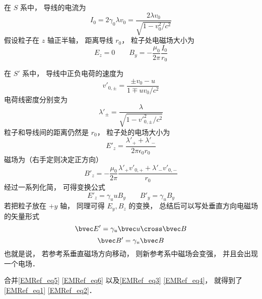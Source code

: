 在 $S$ 系中， 导线的电流为
\begin{equation}
I_0 = 2 \gamma_0 \lambda v_0 = \frac{2 \lambda v_0}{\sqrt{1 - v_0^2/c^2}}
\end{equation}
假设粒子在 $z$ 轴正半轴， 距离导线 $r_0$， 粒子处电磁场大小为
\begin{equation}
E_z = 0 \qquad B_y = -\frac{\mu_0}{2\pi} \frac{I_0}{r_0}
\end{equation}

在 $S'$ 系中， 导线中正负电荷的速度为
\begin{equation}
v'_{0, \pm} = \frac{\pm v_0-u}{1 \mp uv_0/c^2}
\end{equation}
电荷线密度分别变为
\begin{equation}
\lambda'_\pm = \frac{\lambda}{\sqrt{1 - v'^2_{0,\pm}/c^2}}
\end{equation}
粒子和导线间的距离仍然是 $r_0$， 粒子处的电场大小为
\begin{equation}
E'_z = \frac{\lambda'_+ + \lambda'_-}{2 \pi \epsilon_{0} r_0}
\end{equation}
磁场为（右手定则决定正方向）
\begin{equation}
B'_z = -\frac{\mu_0}{2\pi} \frac{\lambda'_+ v'_{0,+} + \lambda'_- v'_{0,-}}{r_0}
\end{equation}
经过一系列化简， 可得变换公式
\begin{equation}
E'_z = \gamma_u u B_y
\qquad
B'_y = \gamma_u B_y
\end{equation}
若把粒子放在 $+y$ 轴， 同理可得 $E_y, B_z$ 的变换， 总结后可以写处垂直方向电磁场的矢量形式
\begin{equation}\label{EMRef_eq3}
\bvec E' = \gamma_u \bvec u \cross \bvec B
\end{equation}
\begin{equation}\label{EMRef_eq4}
\bvec B' = \gamma_u \bvec B
\end{equation}
也就是说， 若参考系垂直磁场方向移动， 则新参考系中磁场会变强， 并且会出现一个电场．

合并\autoref{EMRef_eq5} \autoref{EMRef_eq6} 以及\autoref{EMRef_eq3} \autoref{EMRef_eq4}， 就得到了\autoref{EMRef_eq1} \autoref{EMRef_eq2}．

